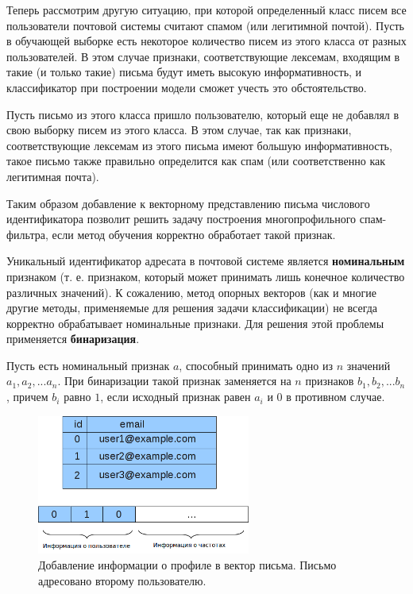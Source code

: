 Теперь рассмотрим другую ситуацию, при которой определенный класс писем все пользователи почтовой системы считают спамом (или легитимной почтой). Пусть в обучающей выборке есть некоторое количество писем из этого класса от разных пользователей. В этом случае признаки, соответствующие лексемам, входящим в такие (и только такие) письма будут иметь высокую информативность, и классификатор при построении модели сможет учесть это обстоятельство.

Пусть письмо из этого класса пришло пользователю, который еще не добавлял в свою выборку писем из этого класса. В этом случае, так как признаки, соответствующие лексемам из этого письма имеют большую информативность, такое письмо также правильно определится как спам (или соответственно как легитимная почта).

Таким образом добавление к векторному представлению письма числового идентификатора позволит решить задачу построения многопрофильного спам-фильтра, если метод обучения корректно обработает такой признак. 

Уникальный идентификатор адресата в почтовой системе является \textbf{номинальным} признаком (т. е. признаком, который может принимать лишь конечное количество различных значений). К сожалению, метод опорных векторов (как и многие другие методы, применяемые для решения задачи классификации) не всегда корректно обрабатывает номинальные признаки.\cite{YURYSVM} Для решения этой проблемы применяется \textbf{бинаризация}.

Пусть есть номинальный признак $a$, способный принимать одно из $n$ значений $a_1, a_2, ... a_n$. При бинаризации такой признак заменяется на $n$ признаков $b_1, b_2, ... b_n$, причем $b_i$ равно $1$, если исходный признак равен $a_i$ и $0$ в противном случае.

\begin{figure}[h]
\begin{center}
\includegraphics[width=7cm]{img/add_uid}
\end{center}
\caption{Добавление информации о профиле в вектор письма. Письмо адресовано второму пользователю.}
\label{multiprofile}
\end{figure}


